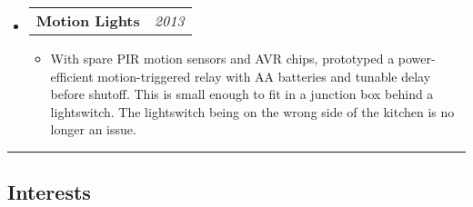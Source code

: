 \documentclass[10pt,letterpaper]{article}
\makeatletter
\newcommand{\headerrow}[2]
{\begin{tabular*}{\linewidth}{l@{\extracolsep{\fill}}r}
	#1 & #2 \\
\end{tabular*}}
\makeatother
\begin{document}
\begin{itemize}
        \item \headerrow{\textbf{Motion Lights}}{\emph{2013}}
        \begin{itemize}
            \item With spare PIR motion sensors and AVR chips, prototyped a
                power-efficient motion-triggered relay with AA batteries and
                tunable delay before shutoff.  This is small enough to fit in a
                junction box behind a lightswitch.  The lightswitch being on
                the wrong side of the kitchen is no longer an issue.
        \end{itemize}
    \end{itemize}

\hrule
\vspace{-0.4em}
\subsection*{Interests}
\end{document}
